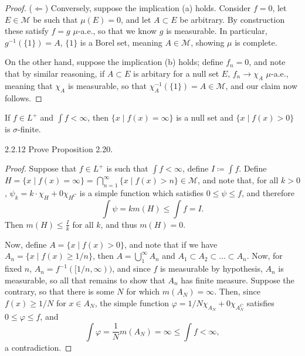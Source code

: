\documentclass[11pt]{article}
\begin{document}
\begin{proof}
(\(\Leftarrow\)) Conversely, suppose the implication (a) holds.
Consider \( f = 0 \), let \( E \in \mathcal{M} \) be such that \( \mu(E) = 0 \), and let \( A \subset E \) be arbitrary.
By construction these satisfy \( f = g \) \(\mu\)-a.e., so that we know \( g \) is measurable.
In particular, \( g^{-1}(\{1\}) = A \), \( \{1\} \) is a Borel set, meaning \( A \in \mathcal{M} \), showing \(\mu\) is complete.

On the other hand, suppose the implication (b) holds; define \( f_n = 0 \), and note that by similar reasoning, if \( A \subset E \) is arbitary for a null set \( E \), \( f_n \rightarrow \chi_A \) \(\mu\)-a.e., meaning that \(\chi_A\) is measurable, so that \( \chi_A^{-1}(\{1\}) = A \in \mathcal{M}\), and our claim now follows.
\end{proof}

\begin{prop}[2.20]
	If \( f \in L^+ \) and \( \int f < \infty \), then \( \{ x \mid f(x) = \infty\} \) is a null set and \( \{ x \mid f(x) > 0 \} \) is \(\sigma\)-finite.
\end{prop}

\begin{problem}{2.2.12}
	Prove Proposition 2.20.
\end{problem}
\begin{proof}
	Suppose that \( f \in L^+ \) is such that \( \int f < \infty \), define \( I \coloneq \int f \).
	Define \( H = \{ x \mid f(x) = \infty\} = \bigcap_{n=1}^{\infty} \{ x \mid f(x) > n \} \in \mathcal{M}\), and note that, for all \( k > 0 \), \(\psi_{k} = k\cdot\chi_H + 0 \chi_{H^{C}}\) is a simple function which satisfies \( 0 \leq \psi \leq f \), and therefore
	\begin{equation}
		\label{eq:6}
		\int \psi = k m(H) \leq \int f = I.
	\end{equation}
  Then \( m(H) \leq \frac{I}{k} \) for all \( k \), and thus \( m(H) = 0 \).

	Now, define \( A = \{ x \mid f(x) > 0 \} \), and note that if we have \( A_n = \{ x \mid f(x) \geq 1/n \} \), then \( A = \bigcup_1^{\infty} A_n \) and \( A_1 \subset A_2 \subset \dots \subset A_n \).
	Now, for fixed \( n \), \( A_n = f^{-1}([1/n, \infty)) \), and since \( f \) is measurable by hypothesis, \( A_n \) is measurable, so all that remains to show that \( A_n \) has finite measure.
	Suppose the contrary, so that there is some \( N \) for which \( m(A_N) = \infty \).
	Then, since \( f(x) \geq 1/N \) for \( x \in A_N \), the simple function \(\varphi = 1/N \chi_{A_N} + 0 \chi_{A_N^C}\) satisfies \( 0 \leq \varphi \leq f \), and
	\begin{equation}
		\label{eq:7}
		\int \varphi = \frac{1}{N}m(A_N) = \infty \leq \int f < \infty,
	\end{equation}
	a contradiction.
\end{proof}
\end{document}

